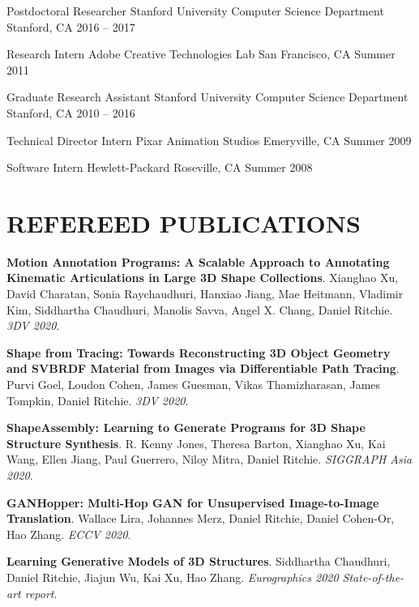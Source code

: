 \documentclass[line,margin]{res}
\begin{document}
\begin{resume}
\job
{Postdoctoral Researcher}
{Stanford University Computer Science Department}
{Stanford, CA}
{2016 -- 2017}

\job
{Research Intern}
{Adobe Creative Technologies Lab}
{San Francisco, CA}
{Summer 2011}

\job
{Graduate Research Assistant}
{Stanford University Computer Science Department}
{Stanford, CA}
{2010 -- 2016}

\job
{Technical Director Intern}
{Pixar Animation Studios}
{Emeryville, CA}
{Summer 2009}

\job
{Software Intern}
{Hewlett-Packard}
{Roseville, CA}
{Summer 2008}


\section{REFEREED PUBLICATIONS}

\newcommand{\pubtitle}[1]{\textbf{#1}}
\newcommand{\pubauthors}[1]{#1}
\newcommand{\pubvenue}[1]{\emph{#1}}
\newcommand{\pubaward}[1]{\textsc{#1}}

\pubtitle{Motion Annotation Programs: A Scalable Approach to Annotating Kinematic Articulations in Large 3D Shape Collections}.
\pubauthors{Xianghao Xu, David Charatan, Sonia Raychaudhuri, Hanxiao Jiang, Mae Heitmann, Vladimir Kim, Siddhartha Chaudhuri, Manolis Savva, Angel X. Chang, Daniel Ritchie}.
\pubvenue{3DV 2020}.

\pubtitle{Shape from Tracing: Towards Reconstructing 3D Object Geometry and SVBRDF Material from Images via Differentiable Path Tracing}.
\pubauthors{Purvi Goel, Loudon Cohen, James Guesman, Vikas Thamizharasan, James Tompkin, Daniel Ritchie}.
\pubvenue{3DV 2020}.

\pubtitle{ShapeAssembly: Learning to Generate Programs for 3D Shape Structure Synthesis}.
\pubauthors{R. Kenny Jones, Theresa Barton, Xianghao Xu, Kai Wang, Ellen Jiang, Paul Guerrero, Niloy Mitra, Daniel Ritchie.}
\pubvenue{SIGGRAPH Asia 2020}.

\pubtitle{GANHopper: Multi-Hop GAN for Unsupervised Image-to-Image Translation}. 
\pubauthors{Wallace Lira, Johannes Merz, Daniel Ritchie, Daniel Cohen-Or, Hao Zhang.}
\pubvenue{ECCV 2020}.

\pubtitle{Learning Generative Models of 3D Structures}. 
\pubauthors{Siddhartha Chaudhuri, Daniel Ritchie, Jiajun Wu, Kai Xu, Hao Zhang.}
\pubvenue{{Eurographics} 2020 State-of-the-art report}.


\end{resume}
\end{document}
